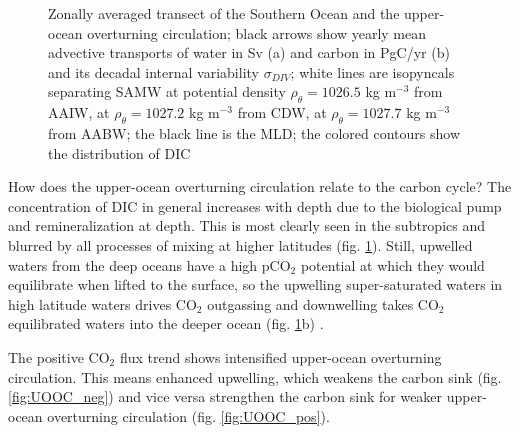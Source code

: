 \begin{figure}[h!]
	\centering
	\vspace{-8mm}
	\caption{Zonally averaged transect of the Southern Ocean and the upper-ocean overturning circulation; black arrows show yearly mean advective transports of water in Sv (a) and carbon in PgC/yr (b) and its decadal internal variability $\sigma_{DIV}$; white lines are isopyncals separating \ac{SAMW} at potential density $\rho_{\theta\text{}}=1026.5$ kg m$^{-3}$ from \ac{AAIW}, at $\rho_{\theta\text{}}=1027.2$ kg m$^{-3}$ from \ac{CDW}, at $\rho_{\theta\text{}}=1027.7$ kg m$^{-3}$ from \ac{AABW}; the black line is the \ac{MLD}; the colored contours show the distribution of \acs{DIC}}
	\label{fig:UOOC_mean}
\end{figure}


How does the upper-ocean overturning circulation relate to the carbon cycle? The concentration of \acs{DIC} in general increases with depth due to the biological pump and remineralization at depth. This is most clearly seen in the subtropics and blurred by all processes of mixing at higher latitudes (fig. \ref{fig:UOOC_mean}). Still, upwelled waters from the deep oceans have a high pCO$_2$ potential at which they would equilibrate when lifted to the surface, so the upwelling super-saturated waters in high latitude waters drives CO$_2$ outgassing and downwelling takes CO$_2$ equilibrated waters into the deeper ocean (fig. \ref{fig:UOOC_mean}b) \citep{Morrison2015}.\newline 


The positive CO$_2$ flux trend shows intensified upper-ocean overturning circulation. This means enhanced upwelling, which weakens the carbon sink (fig. \ref{fig:UOOC_neg}) and vice versa strengthen the carbon sink for weaker upper-ocean overturning circulation (fig. \ref{fig:UOOC_pos}). %

